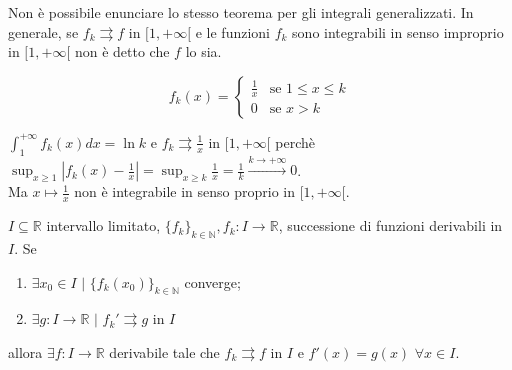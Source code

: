 \begin{attbar}
	Non è possibile enunciare lo stesso teorema per gli integrali generalizzati.  In generale, se $f_k \rightrightarrows f$ in $[1,+\infty[$ e le funzioni $f_k$ sono integrabili in senso improprio in $[1,+\infty[$ non è detto che $f$ lo sia.
\end{attbar}

\begin{equation*}
	f_k(x) =
	\begin{cases}
		\frac{1}{x} & \text{se } 1 \leq x \leq k
		\\
		0 & \text{se } x > k
	\end{cases}
\end{equation*}


$\int_{1}^{+\infty}f_k(x)dx=\ln k$ e $f_k \rightrightarrows \frac{1}{x}$ in $[1,+\infty[$ perchè $\sup_{x \geq 1}|f_k(x) -\frac{1}{x}|=\sup_{x \geq k}\frac{1}{x}=\frac{1}{k} \xrightarrow{k \rightarrow +\infty} 0$.\\
Ma $x \mapsto \frac{1}{x}$ non è integrabile in senso proprio in $[1,+\infty[$.


\begin{theorem}
	\label{th: pag 209}
	$I \subseteq \mathbb{R}$ intervallo limitato, $\{f_k\}_{k \in \mathbb{N}}, f_k: I \rightarrow \mathbb{R}$, successione di funzioni derivabili in $I$. Se 
	\begin{enumerate}
		\item $\exists x_0 \in I\,\, |\,\, \{f_k(x_0)\}_{k \in \mathbb{N}} $ converge;
		
		\item $\exists g:I \rightarrow \mathbb{R} \,\, |\,\, f_k' \rightrightarrows g$ in $I$
	\end{enumerate}
	
	allora $\exists f: I \rightarrow \mathbb{R}$ derivabile tale che $f_k\rightrightarrows f$ in $I$ e $f' (x)= g(x) \,\, \forall x \in I$.
\end{theorem}


